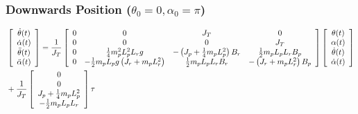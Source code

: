 \subsubsection*{Downwards Position (\( \theta_0=0, \alpha_0=\pi \))}
\begin{align*}
     & \left[\begin{array}{c}
            \dot{\theta}(t)  \\
            \dot{\alpha}(t)  \\
            \ddot{\theta}(t) \\
            \ddot{\alpha}(t)
        \end{array}\right] = \frac{1}{J_T}
    \left[\begin{array}{c c c c}
            0 & 0                                                     & J_T                                            & 0                                  \\
            0 & 0                                                     & 0                                              & J_T                                \\
            0 & \frac{1}{4} m_{p}^2 L_{p}^2 L_r g                     & -\left(J_p + \frac{1}{4} m_p L_{p}^2\right)B_r & \frac{1}{2} m_p L_p L_r B_p        \\
            0 & -\frac{1}{2} m_p L_p g \left(J_r + m_p L_{r}^2\right) & \frac{1}{2} m_p L_p L_r B_r                    & -\left(J_r + m_p L_{r}^2\right)B_p
        \end{array}\right]
    \left[\begin{array}{c}
            \theta(t)       \\
            \alpha(t)       \\
            \dot{\theta}(t) \\
            \dot{\alpha}(t)
        \end{array}\right]                    \\
     & + \frac{1}{J_T}
    \left[\begin{array}{c}
            0                             \\
            0                             \\
            J_p + \frac{1}{4} m_p L_{p}^2 \\
            -\frac{1}{2} m_p L_p L_r
        \end{array}\right] \tau
\end{align*}

